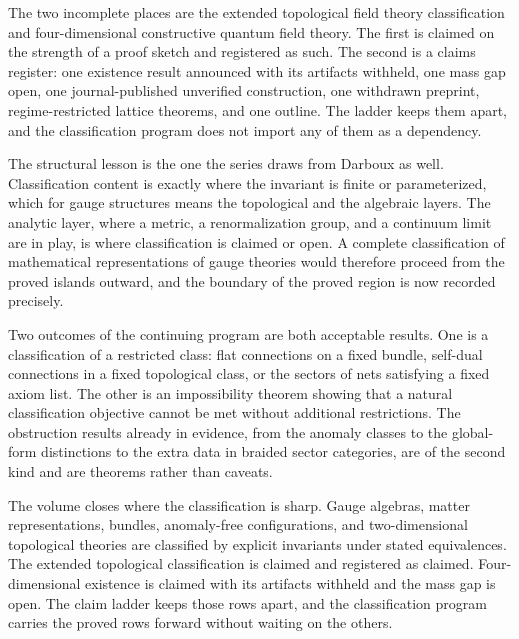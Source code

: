 \documentclass[11pt,letterpaper]{article}
\theoremstyle{definition}
\theoremstyle{remark}
\begin{document}
The two incomplete places are the extended topological field theory classification and four-dimensional constructive quantum field theory. The first is claimed on the strength of a proof sketch and registered as such. The second is a claims register: one existence result announced with its artifacts withheld, one mass gap open, one journal-published unverified construction, one withdrawn preprint, regime-restricted lattice theorems, and one outline. The ladder keeps them apart, and the classification program does not import any of them as a dependency.

The structural lesson is the one the series draws from Darboux as well. Classification content is exactly where the invariant is finite or parameterized, which for gauge structures means the topological and the algebraic layers. The analytic layer, where a metric, a renormalization group, and a continuum limit are in play, is where classification is claimed or open. A complete classification of mathematical representations of gauge theories would therefore proceed from the proved islands outward, and the boundary of the proved region is now recorded precisely.

Two outcomes of the continuing program are both acceptable results. One is a classification of a restricted class: flat connections on a fixed bundle, self-dual connections in a fixed topological class, or the sectors of nets satisfying a fixed axiom list. The other is an impossibility theorem showing that a natural classification objective cannot be met without additional restrictions. The obstruction results already in evidence, from the anomaly classes to the global-form distinctions to the extra data in braided sector categories, are of the second kind and are theorems rather than caveats.

The volume closes where the classification is sharp. Gauge algebras, matter representations, bundles, anomaly-free configurations, and two-dimensional topological theories are classified by explicit invariants under stated equivalences. The extended topological classification is claimed and registered as claimed. Four-dimensional existence is claimed with its artifacts withheld and the mass gap is open. The claim ladder keeps those rows apart, and the classification program carries the proved rows forward without waiting on the others.
\end{document}
